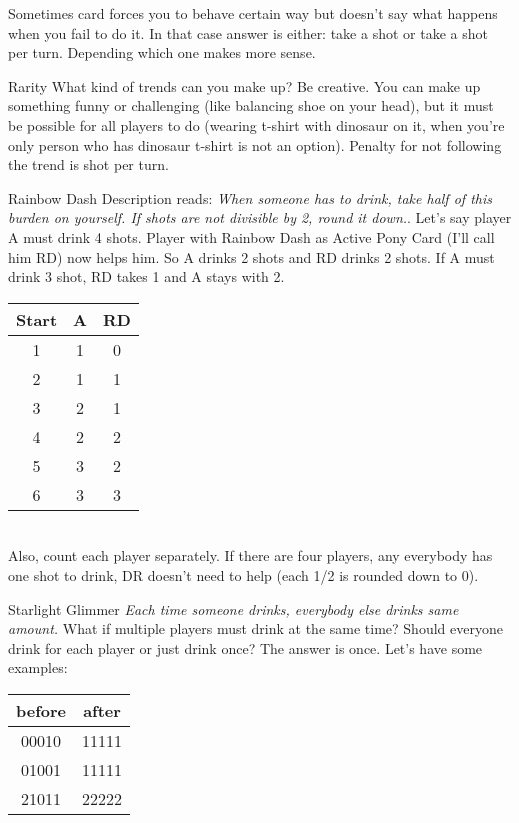 \documentclass[notitlepage]{article}
\begin{document}
Sometimes card forces you to behave certain way but doesn't say what happens when you fail to do it. In that case answer is either: take a shot or take a shot per turn. Depending which one makes more sense.

Rarity\newline
What kind of trends can you make up? Be creative. You can make up something funny or challenging (like balancing shoe on your head), but it must be possible for all players to do (wearing t-shirt with dinosaur on it, when you're only person who has dinosaur t-shirt is not an option). Penalty for not following the trend is shot per turn.

Rainbow Dash\newline
Description reads: \textsl{When someone has to drink, take half of this burden on yourself. If shots are not divisible by 2, round it down.}. 
Let's say player A must drink 4 shots. Player with Rainbow Dash as Active Pony Card (I'll call him RD) now helps him. So A drinks 2 shots and RD drinks 2 shots. If A must drink 3 shot, RD takes 1 and A stays with 2. \\
\begin{tabular}{| c | c | c |}
\hline
Start & A & RD \\ \hline
1 & 1 & 0 \\ \hline
2 & 1 & 1 \\ \hline
3 & 2 & 1 \\ \hline
4 & 2 & 2 \\ \hline
5 & 3 & 2 \\ \hline
6 & 3 & 3 \\ \hline
\end{tabular} \\
Also, count each player separately. If there are four players, any everybody has one shot to drink, DR doesn't need to help (each 1/2 is rounded down to 0).

Starlight Glimmer\newline
\textsl{Each time someone drinks, everybody else drinks same amount.} What if multiple players must drink at the same time? Should everyone drink for each player or just drink once? The answer is once. Let's have some examples: \\
\begin{tabular}{| c | c |}
\hline
before & after \\ \hline
00010 & 11111 \\ \hline
01001 & 11111 \\ \hline
21011 & 22222 \\ \hline
\end{tabular}
\end{document}
